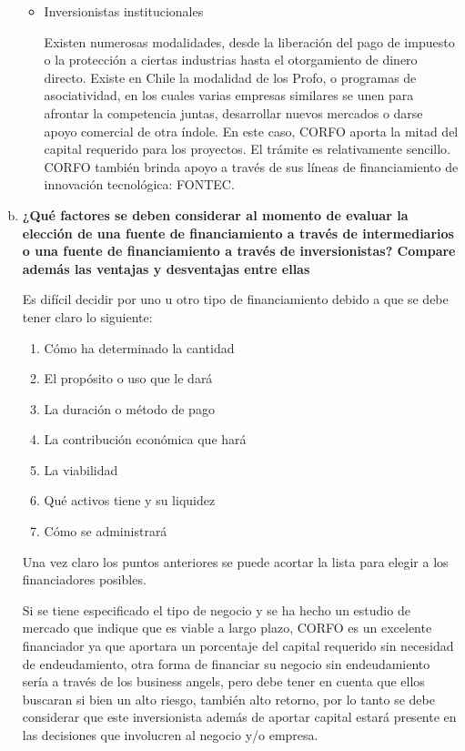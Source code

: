 \begin{enumerate}[(a)]
\begin{itemize}
                \item  Inversionistas institucionales
            
                    Existen numerosas modalidades, desde la liberación del pago de impuesto o la protección a ciertas industrias hasta el otorgamiento 
                    de dinero directo. Existe en Chile la modalidad de los Profo, o programas de asociatividad, en los cuales varias empresas similares 
                    se unen para afrontar la competencia juntas, desarrollar nuevos mercados o darse apoyo comercial de otra índole. En este caso, 
                    CORFO aporta la mitad del capital requerido para los proyectos. El trámite es relativamente sencillo. CORFO también brinda apoyo a través 
                    de sus líneas de financiamiento de innovación tecnológica: FONTEC.
            \end{itemize}


    \newpage
    \item {\bf ¿Qué factores se deben considerar al momento de evaluar la elección de una
          fuente de financiamiento a través de intermediarios o una fuente de financiamiento
          a través de inversionistas? Compare además las ventajas y desventajas entre ellas}\\


            Es difícil decidir por uno u otro tipo de financiamiento debido a que se debe tener claro lo siguiente:
           
            \begin{enumerate} 
                \item Cómo ha determinado la cantidad
                \item El propósito o uso que le dará
                \item La duración o método de pago
                \item La contribución económica que hará
                \item La viabilidad
                \item Qué activos tiene y su liquidez
                \item Cómo se administrará
            \end{enumerate}
            
            Una vez claro los puntos anteriores se puede acortar la lista para elegir a los financiadores posibles. 

            Si se tiene especificado el tipo de negocio y se ha hecho un estudio de mercado que indique que es viable a largo plazo,
            CORFO es un excelente financiador ya que aportara un porcentaje del capital requerido sin necesidad de endeudamiento, otra forma de
            financiar su negocio sin endeudamiento sería a través de los business angels, pero debe tener en cuenta que ellos buscaran si bien
            un alto riesgo, también alto retorno, por lo tanto se debe considerar que este inversionista además de aportar capital estará presente
            en las decisiones que involucren al negocio y/o empresa.


\end{enumerate}
